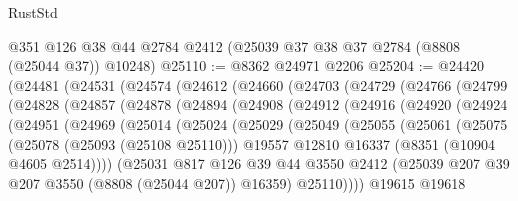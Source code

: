 \begin{lexlean}{RustStd}
\begin{coremodule}
    @351
    @126
    @38
    @44
    @2784
    @2412
    (@25039 @37 @38 @37 @2784 (@8808 (@25044 @37)) @10248)
@25110 := @8362 @24971 @2206
@25204 := @24420
    (@24481
      (@24531
        (@24574
          (@24612
            (@24660
              (@24703
                (@24729
                  (@24766
                    (@24799
                      (@24828
                        (@24857
                          (@24878
                            (@24894
                              (@24908
                                (@24912
                                  (@24916
                                    (@24920
                                      (@24924
                                        (@24951
                                          (@24969
                                            (@25014
                                              (@25024
                                                (@25029
                                                  (@25049
                                                    (@25055
                                                      (@25061
                                                        (@25075
                                                          (@25078 (@25093 (@25108 @25110)))
                                                          @19557
                                                          @12810
                                                          @16337
                                                          (@8351 (@10904 @4605 @2514))))
                                                      (@25031
                                                        @817
                                                        @126
                                                        @39
                                                        @44
                                                        @3550
                                                        @2412
                                                        (@25039
                                                          @207
                                                          @39
                                                          @207
                                                          @3550
                                                          (@8808 (@25044 @207))
                                                          @16359)
                                                        @25110))))
                                                @19615
                                                @19618

\end{coremodule}
\end{lexlean}
